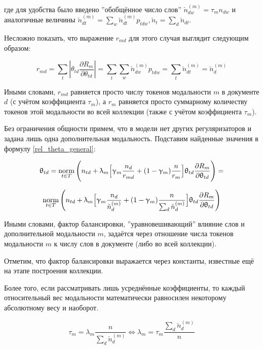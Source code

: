 где для удобства было введено ''обобщённое число слов'' $\check{n}_{dw}^{(m)} = \tau_m n_{dw}$ и аналогичные величины $\check{n}_{dt}^{(m)} = \sum_w \check{n}_{dt}^{(m)} p_{tdw}, \check{n}_t = \sum_d \check{n}_{dt}$.  

Несложно показать, что выражение $r_{md}$ для этого случая выглядит следующим образом: 

\[ 

r_{md} = \sum_t |\theta_{td} \frac{\partial R_m}{\partial \theta_{td}}| = \sum_t \sum_w \check{n}_{dw}^{(m)} p_{tdw} = \sum_t  \check{n}_{dt}^{(m)} = \check{n}_{d}^{(m)} 

\] 

Иными словами, $r_{md}$ равняется просто числу токенов модальности $m$ в документе $d$ (с учётом коэффициента $\tau_m$), а $r_m$ равняется просто суммарному количеству токенов этой модальности во всей коллекции (также с учётом коэффициента $\tau_m$).  

Без ограничения общности примем, что в модели нет других регуляризаторов и задана лишь одна дополнительная модальность. Подставим найденные значения в формулу \ref{rel_theta_general}: 

\[ 

\theta_{td} = \norm_{t \in T} \Bigg(  
    n_{td} + \lambda_m \Big[ 
        \gamma_m \frac{n_d}{r_{md}} + (1-\gamma_m)\frac{n}{r_m} 
        \Big]  
    \theta_{td} \frac{\partial R_m}{\partial \theta_{td}} 
\Bigg) =  

\] 

\[ 

\norm_{t \in T} \Bigg(  
    n_{td} + \lambda_m \Big[ 
        \gamma_m \frac{n_d}{\check{n}_d^{(m)}} + (1-\gamma_m)\frac{n}{\sum_d \check{n}_d^{(m)}} 
        \Big]  
    \theta_{td} \frac{\partial R_m}{\partial \theta_{td}} 
\Bigg) 

\] 

Иными словами, фактор балансировки, ''уравновешивающий'' влияние слов и дополнительной модальности $m$, задаётся через отношение числа токенов модальности $m$ к числу слов в документе (либо во всей коллекции).  

Отметим, что фактор балансировки выражается через константы, известные ещё на этапе построения коллекции.  

Более того, если рассматривать лишь усреднённые коэффициенты, то каждый относительный вес модальности математически равносилен некоторому абсолютному весу и наоборот.  

\[ 

\tau_m = \lambda_m \frac{n}{\sum_d \check{n}_d^{(m)}} \iff  
\lambda_m = \tau_m \frac{\sum_d \check{n}_d^{(m)}}{n} 

\] 

